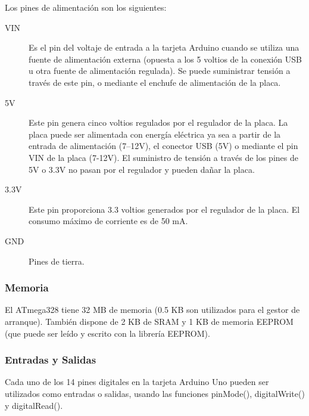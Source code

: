 Los pines de alimentación son los siguientes:
\begin{description}
\item[VIN] Es el pin del voltaje de entrada a la tarjeta Arduino cuando se utiliza una fuente de alimentación externa (opuesta a los 5 voltios de la conexión USB u otra fuente de alimentación regulada). Se puede suministrar tensión a través de este pin, o mediante el enchufe de alimentación de la placa.
\item[5V] Este pin genera cinco voltios regulados por el regulador de la placa. La placa puede ser alimentada con energía eléctrica ya sea a partir de la entrada de alimentación (7–12V), el conector USB (5V) o mediante el pin VIN de la placa (7-12V). El suministro de tensión a través de los pines de 5V o 3.3V no pasan por el regulador y pueden dañar la placa.
\item[3.3V] Este pin proporciona 3.3 voltios generados por el regulador de la placa. El consumo máximo de corriente es de 50 mA.
\item[GND] Pines de tierra.
\end{description}



\subsubsection{Memoria}
El ATmega328 tiene 32 MB de memoria (0.5 KB son utilizados para el gestor de arranque). También dispone de 2 KB de SRAM y 1 KB de memoria EEPROM (que puede ser leído y escrito con la librería EEPROM).



\subsubsection{Entradas y Salidas}
Cada uno de los 14 pines digitales en la tarjeta Arduino Uno pueden ser utilizados como entradas o salidas, usando las funciones pinMode(), digitalWrite() y digitalRead().

